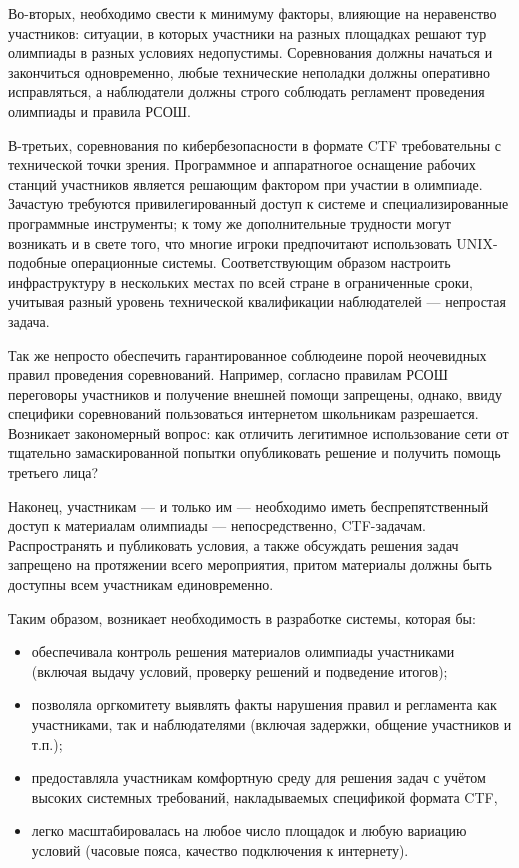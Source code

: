 Во-вторых, необходимо свести к минимуму факторы, влияющие на неравенство участников: ситуации, в которых участники на разных площадках решают тур олимпиады в разных условиях недопустимы. Соревнования должны начаться и закончиться одновременно, любые технические неполадки должны оперативно исправляться, а наблюдатели должны строго соблюдать регламент проведения олимпиады и правила РСОШ.

В-третьих, соревнования по кибербезопасности в формате CTF требовательны с технической точки зрения. Программное и аппаратногое оснащение рабочих станций участников является решающим фактором при участии в олимпиаде. Зачастую требуются привилегированный доступ к системе и специализированные программные инструменты; к тому же дополнительные трудности могут возникать и в свете того, что многие игроки предпочитают использовать UNIX-подобные операционные системы. Соответствующим образом настроить инфраструктуру в нескольких местах по всей стране в ограниченные сроки, учитывая разный уровень технической квалификации наблюдателей — непростая задача.

Так же непросто обеспечить гарантированное соблюдеине порой неочевидных правил проведения соревнований. Например, согласно правилам РСОШ переговоры участников и получение внешней помощи запрещены, однако, ввиду специфики соревнований пользоваться интернетом школьникам разрешается. Возникает закономерный вопрос: как отличить легитимное использование сети от тщательно замаскированной попытки опубликовать решение и получить помощь третьего лица?

Наконец, участникам — и только им — необходимо иметь беспрепятственный доступ к материалам олимпиады — непосредственно, CTF-задачам. Распространять и публиковать условия, а также обсуждать решения задач запрещено на протяжении всего мероприятия, притом материалы должны быть доступны всем участникам единовременно.

Таким образом, возникает необходимость в разработке системы, которая бы:
\begin{itemize}
\item
  обеспечивала контроль решения материалов олимпиады участниками (включая выдачу условий, проверку решений и подведение итогов);
\item
  позволяла оргкомитету выявлять факты нарушения правил и регламента как участниками, так и наблюдателями (включая задержки, общение участников и т.п.);
\item
  предоставляла участникам комфортную среду для решения задач с учётом высоких системных требований, накладываемых спецификой формата CTF,
\item
  легко масштабировалась на любое число площадок и любую вариацию условий (часовые пояса, качество подключения к интернету).
\end{itemize}

